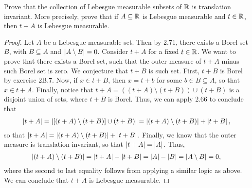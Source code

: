 \begin{exercise}{8}
Prove that the collection of Lebesgue measurable subsets of $\mathbb{R}$ is translation invariant.
More precisely, prove that if $A \subseteq \mathbb{R}$ is Lebesgue measurable and $t \in \mathbb{R}$, then $t+A$ is Lebesgue measurable.
\end{exercise}
\begin{proof}
Let $A$ be a Lebesgue measurable set.
Then by 2.71, there exists a Borel set $B$, with $B \subseteq A$ and $\left\lvert A \setminus B\right\rvert=0$.
Consider $t+A$ for a fixed $t\in\mathbb{R}$.
We want to prove that there exists a Borel set, such that the outer measure of $t+A$ minus such Borel set is zero.
We conjecture that $t+B$ is such set.
First, $t+B$ is Borel by exercise 2B.7.
Now, if $x\in t+B$, then $x = t+b$ for some $b \in B \subseteq A$, so that $x \in t+A$.
Finally, notice that $t+A = ((t+A) \setminus (t+B)) \cup (t+B)$ is a disjoint union of sets, where $t+B$ is Borel.
Thus, we can apply 2.66 to conclude that 
\begin{align*}
    \left\lvert t+A\right\rvert 
    = \left\lvert [(t+A) \setminus (t+B)] \cup (t+B)\right\rvert 
    = \left\lvert (t+A) \setminus (t+B)\right\rvert + \left\lvert t+B\right\rvert,
\end{align*}
so that $\left\lvert t+A\right\rvert = \left\lvert (t+A) \setminus (t+B)\right\rvert + \left\lvert t+B\right\rvert$.
Finally, we know that the outer measure is translation invariant, so that $\left\lvert t+A\right\rvert = \left\lvert A\right\rvert$.
Thus,
\begin{align*}
    \left\lvert (t+A) \setminus (t+B)\right\rvert 
    = \left\lvert t+A\right\rvert - \left\lvert t+B\right\rvert
    = \left\lvert A\right\rvert - \left\lvert B\right\rvert
    = \left\lvert A \setminus B\right\rvert
    = 0,
\end{align*}
where the second to last equality follows from applying a similar logic as above.
We can conclude that $t+A$ is Lebesgue measurable.
\end{proof} 

